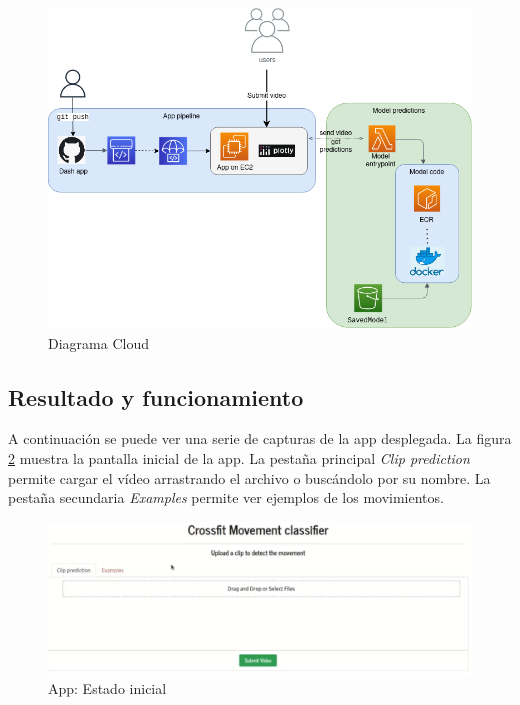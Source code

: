 \begin{figure}[H]
    \centering
		\includegraphics[width=\textwidth]{figs/cloud_diagram.png}
\caption{Diagrama Cloud}\label{cloud_diagram}


\end{figure}

\subsection{Resultado y funcionamiento}

A continuación se puede ver una serie de capturas de la app desplegada. La figura \ref{app_1} muestra la pantalla inicial de la app. La pestaña principal \textit{Clip prediction} permite cargar el vídeo arrastrando el archivo o buscándolo por su nombre. La pestaña secundaria \textit{Examples} permite ver ejemplos de los movimientos. 

\begin{figure}[H]
    \centering
		\includegraphics[width=\textwidth]{figs/app_1.png}
\caption{App: Estado inicial}\label{app_1}
\end{figure}

